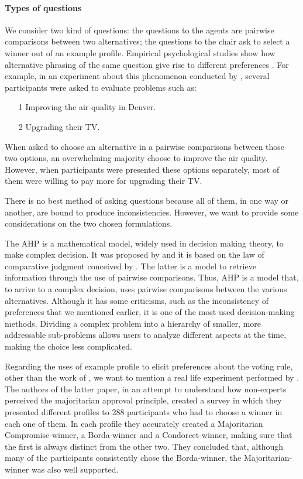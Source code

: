 \paragraph{Types of questions}
We consider two kind of questions: the questions to the agents are pairwise comparisons between two alternatives; the questions to the chair ask to select a winner out of an example profile.
Empirical psychological studies show how alternative phrasing of the same question give rise to different preferences \citep{Tversky1986}. 
For example, in an experiment about this phenomenon conducted by \citet{Irwin1993}, several participants were asked to evaluate problems such as:
\begin{itemize}[nosep]
	\item[1] Improving the air quality in Denver.
	\item[2] Upgrading their TV.
\end{itemize}
When asked to choose an alternative in a pairwise comparisons between those two options, an overwhelming majority choose to improve the air quality. However, when participants were presented these options separately, most of them were willing to pay more for upgrading their TV.

There is no best method of asking questions because all of them, in one way or another, are bound to produce inconsistencies. However, we want to provide some considerations on the two chosen formulations.

The \ac{AHP} is a mathematical model, widely used in decision making theory, to make complex decision. It was proposed by \citet{Saaty1986} and it is based on the law of comparative judgment conceived by \citet{Thurstone1927}. The latter is a model to retrieve information through the use of pairwise comparisons. Thus, \ac{AHP} is a model that, to arrive to a complex decision, uses pairwise comparisons between the various alternatives.
Although it has some criticisms, such as the inconsistency of preferences that we mentioned earlier, it is one of the most used decision-making methods. Dividing a complex problem into a hierarchy of smaller, more addressable sub-problems allows users to analyze different aspects at the time, making the choice less complicated.

Regarding the uses of example profile to elicit preferences about the voting rule, other than the work of \citet{Cailloux2014}, we want to mention a real life experiment performed by \citet{Giritligil2005}. The authors of the latter paper, in an attempt to understand how non-experts perceived the majoritarian approval principle, created a survey in which they presented different profiles to 288 participants who had to choose a winner in each one of them. In each profile they accurately created a Majoritarian Compromise-winner, a Borda-winner and a Condorcet-winner, making sure that the first is always distinct from the other two. They concluded that, although many of the participants consistently chose the Borda-winner, the Majoritarian-winner was also well supported.

